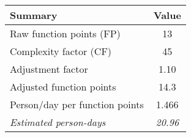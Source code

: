 \begin{tabular}{l|c}
\textbf{Summary} & \textbf{Value} \\ \hline
Raw function points (FP) & 13 \\
Complexity factor (CF) & 45 \\
Adjustment factor & 1.10 \\
Adjusted function points & 14.3 \\
Person/day per function points & 1.466 \\ \hline
\textit{Estimated person-days} & \textit{20.96}
\end{tabular}
